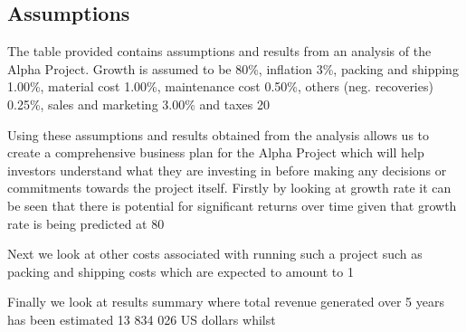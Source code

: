 

\subsection{Assumptions}\label{sec:assumptions}
The table provided contains assumptions and results from an analysis of the Alpha Project. Growth is assumed to be 80\%, inflation 3\%, packing and shipping 1.00\%, material cost 1.00\%, maintenance cost 0.50\%, others (neg. recoveries) 0.25\%, sales and marketing 3.00\% and taxes 20%

Using these assumptions and results obtained from the analysis allows us to create a comprehensive business plan for the Alpha Project which will help investors understand what they are investing in before making any decisions or commitments towards the project itself. Firstly by looking at growth rate it can be seen that there is potential for significant returns over time given that growth rate is being predicted at 80%

Next we look at other costs associated with running such a project such as packing and shipping costs which are expected to amount to 1%

Finally we look at results summary where total revenue generated over 5 years has been estimated 13 834 026 US dollars whilst